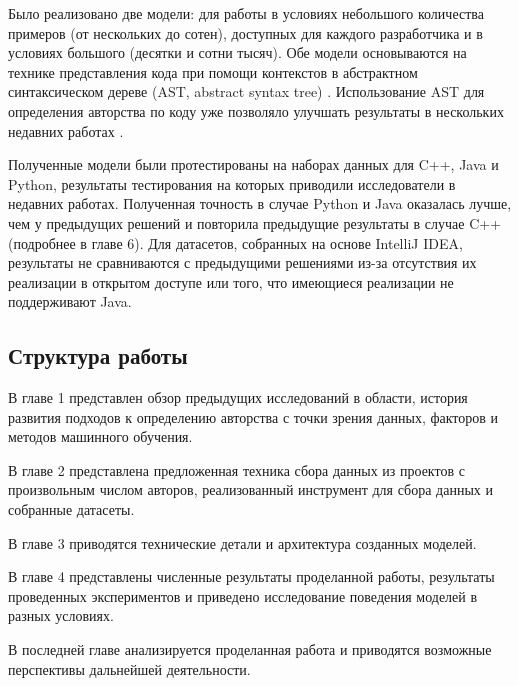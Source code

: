 Было реализовано две модели: для работы в условиях небольшого количества примеров (от нескольких до сотен), доступных для каждого разработчика и в условиях большого (десятки и сотни тысяч). Обе модели основываются на технике представления кода при помощи контекстов в абстрактном синтаксическом дереве (AST, abstract syntax tree) \cite{Alon2018}. Использование AST для определения авторства по коду уже позволяло улучшать результаты в нескольких недавних работах \cite{Caliskan2015,Alsulami2017}.

Полученные модели были протестированы на наборах данных для C++, Java и Python, результаты тестирования на которых приводили исследователи в недавних работах. Полученная точность в случае Python и Java оказалась лучше, чем у предыдущих решений и повторила предыдущие результаты в случае C++ (подробнее в главе 6). Для датасетов, собранных на основе IntelliJ IDEA, результаты не сравниваются с предыдущими решениями из-за отсутствия их реализации в открытом доступе или того, что имеющиеся реализации не поддерживают Java.

\subsection*{Структура работы}
В главе 1 представлен обзор предыдущих исследований в области, история развития подходов к определению авторства с точки зрения данных, факторов и методов машинного обучения. 

В главе 2 представлена предложенная техника сбора данных из проектов с произвольным числом авторов, реализованный инструмент для сбора данных и собранные датасеты.

В главе 3 приводятся технические детали и архитектура созданных моделей.

В главе 4 представлены численные результаты проделанной работы, результаты проведенных экспериментов и приведено исследование поведения моделей в разных условиях.

В последней главе анализируется проделанная работа и приводятся возможные перспективы дальнейшей деятельности.